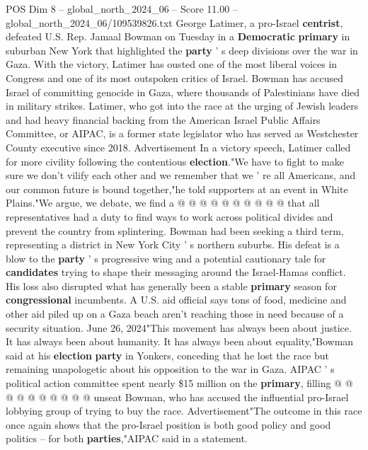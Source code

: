 \begin{textsample}{POS Dim 8 – global\_north\_2024\_06 – Score 11.00 – global\_north\_2024\_06/109539826.txt}  \label{ex:f8_pos_066}
George Latimer, a pro-Israel \textbf{centrist}, defeated U.S.
Rep.
Jamaal Bowman on Tuesday in a \textbf{Democratic} \textbf{primary} in suburban New York that highlighted the \textbf{party} ' s deep divisions over the war in Gaza.
With the victory, Latimer has ousted one of the most liberal voices in Congress and one of its most outspoken critics of Israel.
Bowman has accused Israel of committing genocide in Gaza, where thousands of Palestinians have died in military strikes.
Latimer, who got into the race at the urging of Jewish leaders and had heavy financial backing from the American Israel Public Affairs Committee, or AIPAC, is a former state legislator who has served as Westchester County executive since 2018.
Advertisement In a victory speech, Latimer called for more civility following the contentious \textbf{election}."We have to fight to make sure we don't vilify each other and we remember that we ' re all Americans, and our common future is bound together,"he told supporters at an event in White Plains."We argue, we debate, we find a @ @ @ @ @ @ @ @ @ @ that all representatives had a duty to find ways to work across political divides and prevent the country from splintering.
Bowman had been seeking a third term, representing a district in New York City ' s northern suburbs.
His defeat is a blow to the \textbf{party} ' s progressive wing and a potential cautionary tale for \textbf{candidates} trying to shape their messaging around the Israel-Hamas conflict.
His loss also disrupted what has generally been a stable \textbf{primary} season for \textbf{congressional} incumbents.
A U.S. aid official says tons of food, medicine and other aid piled up on a Gaza beach aren't reaching those in need because of a security situation.
June 26, 2024"This movement has always been about justice.
It has always been about humanity.
It has always been about equality,"Bowman said at his \textbf{election} \textbf{party} in Yonkers, conceding that he lost the race but remaining unapologetic about his opposition to the war in Gaza.
AIPAC ' s political action committee spent nearly \$15 million on the \textbf{primary}, filling @ @ @ @ @ @ @ @ @ @ unseat Bowman, who has accused the influential pro-Israel lobbying group of trying to buy the race.
Advertisement"The outcome in this race once again shows that the pro-Israel position is both good policy and good politics -- for both \textbf{parties},"AIPAC said in a statement.

\end{textsample}
